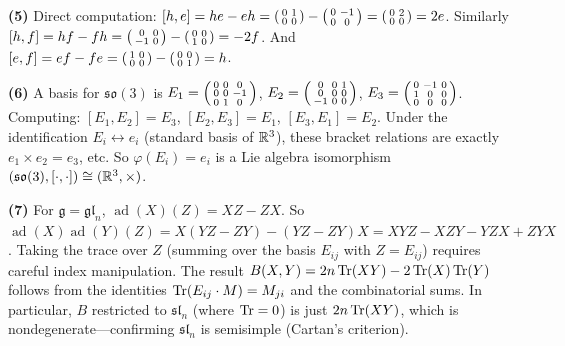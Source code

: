 \documentclass{report}
\begin{document}
\begin{solution}
\textbf{(5)} Direct computation: \([h, e] = he - eh = \begin{psmallmatrix} 0 & 1 \\ 0 & 0 \end{psmallmatrix} - \begin{psmallmatrix} 0 & -1 \\ 0 & 0 \end{psmallmatrix} = \begin{psmallmatrix} 0 & 2 \\ 0 & 0 \end{psmallmatrix} = 2e\). Similarly \([h, f] = hf - fh = \begin{psmallmatrix} 0 & 0 \\ -1 & 0 \end{psmallmatrix} - \begin{psmallmatrix} 0 & 0 \\ 1 & 0 \end{psmallmatrix} = -2f\). And \([e, f] = ef - fe = \begin{psmallmatrix} 1 & 0 \\ 0 & 0 \end{psmallmatrix} - \begin{psmallmatrix} 0 & 0 \\ 0 & 1 \end{psmallmatrix} = h\).

\textbf{(6)} A basis for \(\mathfrak{so}(3)\) is \(E_1 = \begin{psmallmatrix} 0 & 0 & 0 \\ 0 & 0 & -1 \\ 0 & 1 & 0 \end{psmallmatrix}\), \(E_2 = \begin{psmallmatrix} 0 & 0 & 1 \\ 0 & 0 & 0 \\ -1 & 0 & 0 \end{psmallmatrix}\), \(E_3 = \begin{psmallmatrix} 0 & -1 & 0 \\ 1 & 0 & 0 \\ 0 & 0 & 0 \end{psmallmatrix}\). Computing: \([E_1, E_2] = E_3\), \([E_2, E_3] = E_1\), \([E_3, E_1] = E_2\). Under the identification \(E_i \leftrightarrow e_i\) (standard basis of \({\RR}^3\)), these bracket relations are exactly \(e_1 \times e_2 = e_3\), etc. So \(\varphi(E_i) = e_i\) is a Lie algebra isomorphism \((\mathfrak{so}(3), [\cdot, \cdot]) \cong ({\RR}^3, \times)\).

\textbf{(7)} For \(\mathfrak{g} = \mathfrak{gl}_n\), \(\operatorname{ad}(X)(Z) = XZ - ZX\). So \(\operatorname{ad}(X)\operatorname{ad}(Y)(Z) = X(YZ - ZY) - (YZ - ZY)X = XYZ - XZY - YZX + ZYX\). Taking the trace over \(Z\) (summing over the basis \(E_{ij}\) with \(Z = E_{ij}\)) requires careful index manipulation. The result \(B(X, Y) = 2n\operatorname{Tr}(XY) - 2\operatorname{Tr}(X)\operatorname{Tr}(Y)\) follows from the identities \(\operatorname{Tr}(E_{ij} \cdot M) = M_{ji}\) and the combinatorial sums. In particular, \(B\) restricted to \(\mathfrak{sl}_n\) (where \(\operatorname{Tr} = 0\)) is just \(2n\operatorname{Tr}(XY)\), which is nondegenerate---confirming \(\mathfrak{sl}_n\) is semisimple (Cartan's criterion).
\end{solution}
\end{document}
